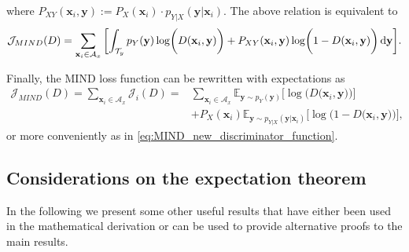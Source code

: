 where $P_{XY}(\mathbf{x}_i,\mathbf{y}):=P_X(\mathbf{x}_i)\cdot p_{Y|X}(\mathbf{y}|\mathbf{x}_i)$. The above relation is equivalent to
\begin{equation}
\small
    \mathcal{J}_{MIND}(D) =  \sum_{\mathbf{x}_i\in \mathcal{A}_x}{\biggl[\int_{\mathcal{T}_y}p_Y(\mathbf{y}) \log \biggl(D(\mathbf{x}_i,\mathbf{y})\biggr) + P_{XY}(\mathbf{x}_i,\mathbf{y}) \log \biggl(1-D(\mathbf{x}_i,\mathbf{y})\biggr) \mathop{}\!\mathrm{d} \mathbf{y}\biggr]}.
\end{equation}

Finally, the MIND loss function can be rewritten with expectations as
\begin{align}
    \mathcal{J}_{MIND}(D) = \sum_{\mathbf{x}_i\in \mathcal{A}_x}\mathcal{J}_{i}(D) =  & \sum_{\mathbf{x}_i\in \mathcal{A}_x}{\mathbb{E}_{\mathbf{y} \sim p_{Y}(\mathbf{y})}\biggl[\log \biggl(D\bigl(\mathbf{x}_i,\mathbf{y}\bigr)\biggr)\biggr]} \nonumber \\ 
    & + P_{X}(\mathbf{x}_i)\mathbb{E}_{\mathbf{y} \sim p_{Y|X}(\mathbf{y}|\mathbf{x}_i)}\biggl[\log \biggl(1-D\bigl(\mathbf{x}_i,\mathbf{y}\bigr)\biggr)\biggr],
\end{align}
or more conveniently as in \eqref{eq:MIND_new_discriminator_function}.

\subsection{Considerations on the expectation theorem}
In the following we present some other useful results that have either been used in the mathematical derivation or can be used to provide alternative proofs to the main results.

